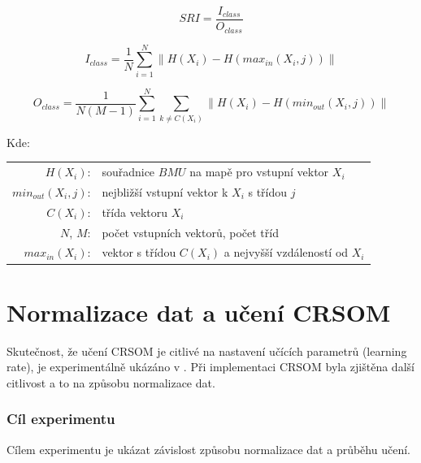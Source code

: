 \documentclass[thesis=M,czech]{FITthesis}[2012/06/26]
\begin{document}
\vspace{\baselineskip}
\noindent
\begin{minipage}[c]{\textwidth }

\begin{equation} \label{eq:sri}
    SRI=\frac{I_{class}}{O_{class}}
\end{equation}

\begin{equation} \label{eq:oclass}
	I_{class}  = \frac{1}{N}\sum_{i=1}^{N}  \| H(X_i) - H(max_{in}(X_i, j)) \|
\end{equation}


\begin{equation} \label{eq:iclass}
	O_{class}= \frac{1}{N(M-1)}\sum_{i=1}^{N}\sum_{k \neq C(X_i)} \| H(X_i) - H(min_{out}(X_i, j)) \|
\end{equation}



Kde:\\
\hspace*{3em}
\begin{tabular}{rl}
    $H(X_i)$:&  souřadnice $BMU$ na mapě pro vstupní vektor $X_i$  \\
    $min_{out}(X_i, j)$: & nejbližší vstupní vektor k $X_i$ s třídou $j$  \\
     $C(X_i)$:& třída vektoru  $X_i$\\
     $N$, $M$:& počet vstupních vektorů, počet tříd\\
     $max_{in}(X_i)$:& vektor s třídou $C(X_i)$ a nejvyšší vzdáleností od $X_i$ \\
\end{tabular}
\end{minipage} 
\vspace{\baselineskip}
\noindent


  



\section{Normalizace dat a učení CRSOM}
Skutečnost, že učení CRSOM je citlivé na nastavení učících parametrů (learning rate), je experimentálně ukázáno v \cite{hartono14}. Při implementaci CRSOM byla zjištěna další citlivost a to na způsobu normalizace dat.




\subsubsection*{Cíl experimentu}
Cílem experimentu je ukázat závislost způsobu normalizace dat a průběhu učení. 
\end{document}

